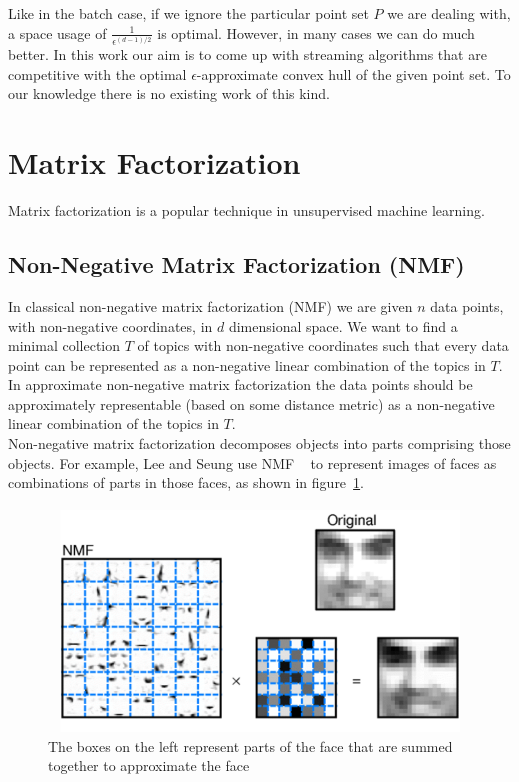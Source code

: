 Like in the batch case, if we ignore the particular point set $P$ we are dealing with, a space usage of $\frac{1}{\epsilon^{(d-1)/2}}$ is optimal. However, in many cases we can do much better. In this work our aim is to come up with streaming algorithms that are competitive with the optimal $\epsilon$-approximate convex hull of the given point set. To our knowledge there is no existing work of this kind.

\section{Matrix Factorization}

Matrix factorization is a popular technique in unsupervised machine learning.

\subsection{Non-Negative Matrix Factorization (NMF)}

In classical non-negative matrix factorization (NMF) we are given $n$ data points, with non-negative coordinates, in $d$ dimensional space. We want to find a minimal collection $T$ of topics with non-negative coordinates such that every data point can be represented as a non-negative linear combination of the topics in $T$. In approximate non-negative matrix factorization the data points should be approximately representable (based on some distance metric) as a non-negative linear combination of the topics in $T$. 
\\

Non-negative matrix factorization decomposes objects into parts comprising those objects. For example, Lee and Seung use NMF ~\cite{leeseung95} to represent images of faces as combinations of parts in those faces, as shown in figure~\ref{fig:image-nmf}.

\begin{figure}[!ht]
\centering
\includegraphics[scale=0.3]{image-nmf}
\caption{The boxes on the left represent parts of the face that are summed together to approximate the face}
\label{fig:image-nmf}
\end{figure}

